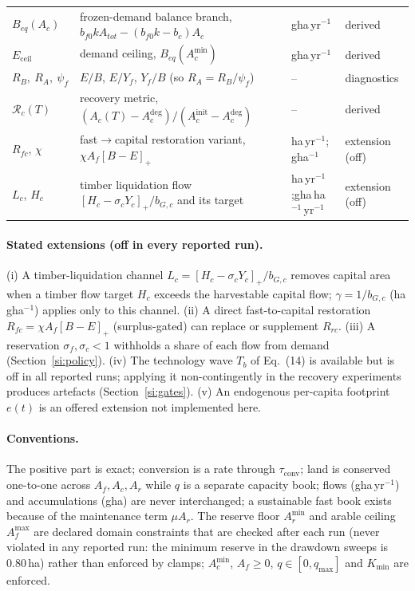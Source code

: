 \documentclass[11pt,a4paper]{article}
\newcommand{\pos}[1]{\left[#1\right]_+}
\newcommand{\Eceil}{E_{\mathrm{ceil}}}
\newcommand{\Acmin}{A_c^{\min}}
\newcommand{\tconv}{\tau_{\mathrm{conv}}}
\begin{document}
\begin{longtable}{>{\raggedright\arraybackslash}p{}>{\raggedright\arraybackslash}p{}>{\raggedright\arraybackslash}p{}>{\raggedright\arraybackslash}p{}}
$B_{eq}(A_c)$ & frozen-demand balance branch, $b_{f0}kA_{tot}-(b_{f0}k-b_c)A_c$ & gha\,yr$^{-1}$ & derived \\
$\Eceil$ & demand ceiling, $B_{eq}(\Acmin)$ & gha\,yr$^{-1}$ & derived \\
$R_B,\ R_A,\ \psi_f$ & $E/B$, $E/Y_f$, $Y_f/B$ (so $R_A=R_B/\psi_f$) & -- & diagnostics \\
$\mathcal R_c(T)$ & recovery metric, $(A_c(T)-A_c^{\mathrm{deg}})/(A_c^{\mathrm{init}}-A_c^{\mathrm{deg}})$ & -- & derived \\
$R_{fc}$, $\chi$ & fast$\to$capital restoration variant, $\chi A_f\pos{B-E}$ & ha\,yr$^{-1}$; gha$^{-1}$ & extension (off) \\
$L_c$, $H_c$ & timber liquidation flow $\pos{H_c-\sigma_cY_c}/b_{G,c}$ and its target & ha\,yr$^{-1}$;\newline gha\,ha$^{-1}$\,yr$^{-1}$ & extension (off) \\
\bottomrule
\end{longtable}

\paragraph{Stated extensions (off in every reported run).} (i) A timber-liquidation channel $L_c=\pos{H_c-\sigma_cY_c}/b_{G,c}$ removes capital area when a timber flow target $H_c$ exceeds the harvestable capital flow; $\gamma=1/b_{G,c}$ (ha\,gha$^{-1}$) applies only to this channel. (ii) A direct fast-to-capital restoration $R_{fc}=\chi A_f\pos{B-E}$ (surplus-gated) can replace or supplement $R_{rc}$. (iii) A reservation $\sigma_f,\sigma_c<1$ withholds a share of each flow from demand (Section~\ref{si:policy}). (iv) The technology wave $T_b$ of Eq.~(14) is available but is off in all reported runs; applying it non-contingently in the recovery experiments produces artefacts (Section~\ref{si:gates}). (v) An endogenous per-capita footprint $e(t)$ is an offered extension not implemented here.

\paragraph{Conventions.} The positive part is exact; conversion is a rate through $\tconv$; land is conserved one-to-one across $A_f,A_c,A_r$ while $q$ is a separate capacity book; flows (gha\,yr$^{-1}$) and accumulations (gha) are never interchanged; a sustainable fast book exists because of the maintenance term $\mu A_r$. The reserve floor $A_r^{\min}$ and arable ceiling $A_f^{\max}$ are declared domain constraints that are checked after each run (never violated in any reported run: the minimum reserve in the drawdown sweeps is $0.80$\,ha) rather than enforced by clamps; $\Acmin$, $A_f\ge0$, $q\in[0,q_{\max}]$ and $K_{\min}$ are enforced.
\end{document}
